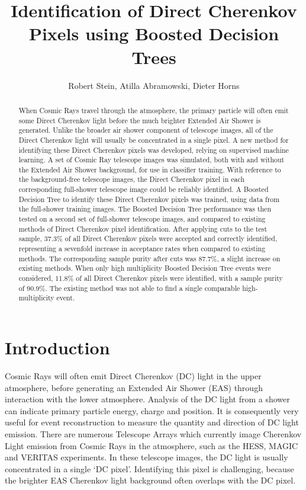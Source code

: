 \documentclass[]{article}
\title{Identification of Direct Cherenkov Pixels using Boosted Decision Trees}
\author{Robert Stein, Atilla Abramowski, Dieter Horns}
\begin{document}
\maketitle

\begin{abstract}
When Cosmic Rays travel through the atmosphere, the primary particle will often emit some Direct Cherenkov light before the much brighter Extended Air Shower is generated. Unlike the broader air shower component of telescope images, all of the Direct Cherenkov light will usually be concentrated in a single pixel. A new method for identifying these Direct Cherenkov pixels was developed, relying on supervised machine learning. A set of Cosmic Ray telescope images was simulated, both with and without the Extended Air Shower background, for use in classifier training. With reference to the background-free telescope images, the Direct Cherenkov pixel in each corresponding full-shower telescope image could be reliably identified. A Boosted Decision Tree to identify these Direct Cherenkov pixels was trained, using data from the full-shower training images. The Boosted Decision Tree performance was then tested on a second set of full-shower telescope images, and compared to existing methods of Direct Cherenkov pixel identification. After applying cuts to the test sample, 37.3\% of all Direct Cherenkov pixels were accepted and correctly identified, representing a sevenfold increase in acceptance rates when compared to existing methods. The corresponding sample purity after cuts was 87.7\%, a slight increase on existing methods. When only high multiplicity Boosted Decision Tree events were considered, 11.8\% of all Direct Cherenkov pixels were identified, with a sample purity of 90.9\%. The existing method was not able to find a single comparable high-multiplicity event. 
\end{abstract}
\section{Introduction}
Cosmic Rays will often emit Direct Cherenkov (DC) light in the upper atmosphere, before generating an Extended Air Shower (EAS) through interaction with the lower atmosphere. Analysis of the DC light from a shower can indicate primary particle energy, charge and position. It is consequently very useful for event reconstruction to measure the quantity and direction of DC light emission. There are numerous Telescope Arrays which currently image Cherenkov Light emission from Cosmic Rays in the atmosphere, such as the HESS, MAGIC and VERITAS experiments. In these telescope images, the DC light is usually concentrated in a single  \textquoteleft DC pixel'. Identifying this pixel is challenging, because the brighter EAS Cherenkov light background often overlaps with the DC pixel. 
\end{document}
